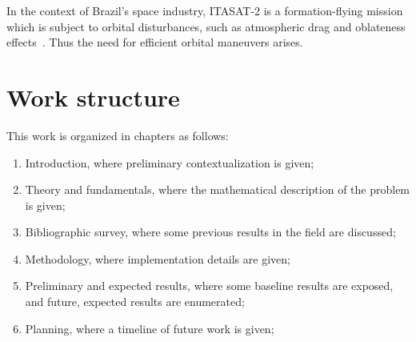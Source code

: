 In the context of Brazil's space industry, ITASAT-2 is a formation-flying mission which is subject to orbital disturbances, such as atmospheric drag and oblateness effects~\cite{itasat2}. Thus the need for efficient orbital maneuvers arises.


\section{Work structure}

This work is organized in chapters as follows:
\begin{enumerate}
    \item Introduction, where preliminary contextualization is given;
    \item Theory and fundamentals, where the mathematical description of the problem is given;
    \item Bibliographic survey, where some previous results in the field are discussed;
    \item Methodology, where implementation details are given;
    \item Preliminary and expected results, where some baseline results are exposed, and future, expected results are enumerated;
    \item Planning, where a timeline of future work is given;
\end{enumerate}